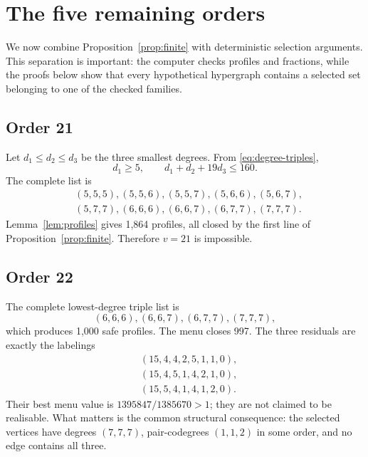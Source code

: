 \documentclass[11pt]{article}
\theoremstyle{remark}
\begin{document}
\section{The five remaining orders}\label{sec:cases}

We now combine Proposition~\ref{prop:finite} with deterministic selection
arguments.  This separation is important: the computer checks profiles and
fractions, while the proofs below show that every hypothetical hypergraph
contains a selected set belonging to one of the checked families.

\subsection{Order 21}

Let $d_1\le d_2\le d_3$ be the three smallest degrees.  From
\eqref{eq:degree-triples},
\[
d_1\ge5,\qquad d_1+d_2+19d_3\le160.
\]
The complete list is
\[
\begin{split}
&(5,5,5),(5,5,6),(5,5,7),(5,6,6),(5,6,7),\\
&(5,7,7),(6,6,6),(6,6,7),(6,7,7),(7,7,7).
\end{split}
\]
Lemma~\ref{lem:profiles} gives 1,864 profiles, all closed by the first line
of Proposition~\ref{prop:finite}.  Therefore $v=21$ is impossible.

\subsection{Order 22}\label{subsec:v22}

The complete lowest-degree triple list is
\[
(6,6,6),(6,6,7),(6,7,7),(7,7,7),
\]
which produces 1,000 safe profiles.  The menu closes 997.  The three
residuals are exactly the labelings
\begin{equation}\label{eq:v22-residuals}
\begin{split}
&(15,4,4,2,5,1,1,0),\\
&(15,4,5,1,4,2,1,0),\\
&(15,5,4,1,4,1,2,0).
\end{split}
\end{equation}
Their best menu value is $1395847/1385670>1$; they are not claimed to be
realisable.  What matters is the common structural consequence: the selected
vertices have degrees $(7,7,7)$, pair-codegrees $(1,1,2)$ in some order, and
no edge contains all three.
\end{document}
